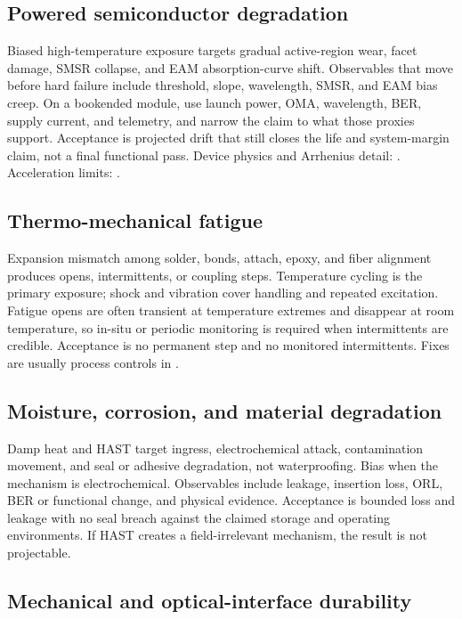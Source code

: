 \subsection{Powered semiconductor degradation}

Biased high-temperature exposure targets gradual active-region wear, facet
damage, SMSR collapse, and EAM absorption-curve shift. Observables that move
before hard failure include threshold, slope, wavelength, SMSR, and EAM bias
creep. On a bookended module, use launch power, OMA, wavelength, BER, supply
current, and telemetry, and narrow the claim to what those proxies support.
Acceptance is projected drift that still closes the life and system-margin
claim, not a final functional pass. Device physics and Arrhenius detail:
. Acceleration limits:
.

\subsection{Thermo-mechanical fatigue}

Expansion mismatch among solder, bonds, attach, epoxy, and fiber alignment
produces opens, intermittents, or coupling steps. Temperature cycling is the
primary exposure; shock and vibration cover handling and repeated excitation.
Fatigue opens are often transient at temperature extremes and disappear at room
temperature, so in-situ or periodic monitoring is required when intermittents
are credible. Acceptance is no permanent step and no monitored intermittents.
Fixes are usually process controls in .

\subsection{Moisture, corrosion, and material degradation}

Damp heat and HAST target ingress, electrochemical attack, contamination
movement, and seal or adhesive degradation, not waterproofing. Bias when the
mechanism is electrochemical. Observables include leakage, insertion loss, ORL,
BER or functional change, and physical evidence. Acceptance is bounded loss and
leakage with no seal breach against the claimed storage and operating
environments. If HAST creates a field-irrelevant mechanism, the result is not
projectable.

\subsection{Mechanical and optical-interface durability}

